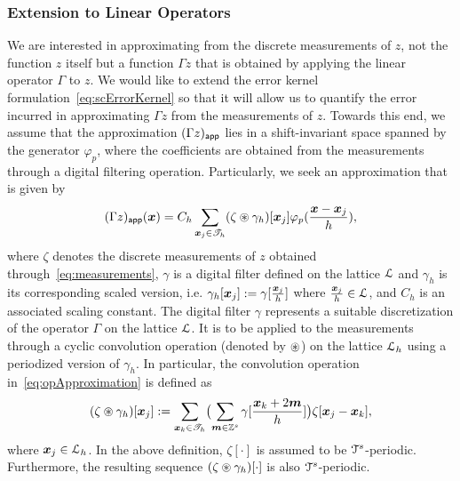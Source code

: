 \subsubsection{Extension to Linear Operators}
We are interested in approximating from the discrete measurements
of $z$, not the function $z$ itself but a function $\Gamma z$ that is obtained
by applying the linear operator $\Gamma$ to $z$. 
We would like to
extend the error kernel formulation~\eqref{eq:scErrorKernel} so that it will
allow us to quantify the error incurred in approximating $\Gamma z$ from the
measurements of $z$. Towards this end, we assume that the approximation
$(\Gamma z)_{\mathsf{app}}$ lies in a shift-invariant space spanned by the generator
$\varphi_p$, where the coefficients are obtained from the measurements through a
digital filtering operation. Particularly, we seek an approximation that is
given by
\begin{equation}
\appf{(\Gamma z)}(\vect{x}) = C_h \sum_{\vect{x}_j \in \pointset{T}_h} 
(\zeta \pconv \gamma_h)[\vect{x}_j]
\varphi_p(\frac{\vect{x}-\vect{x}_j}{h}),
\label{eq:opApproximation}
\end{equation}
where $\zeta$ denotes the discrete measurements of $z$ obtained
through~\eqref{eq:measurements}, $\gamma$ is a digital filter defined on
the lattice $\mathcal{L}$ and $\gamma_h$ is its corresponding scaled
version, i.e. $\gamma_h[\boldsymbol{x}_j] := \gamma[\tfrac{\boldsymbol{x}_j}{h}]$ where
$\tfrac{\boldsymbol{x}_j}{h} \in \mathcal{L}$, and $C_h$ is an associated
scaling constant. The digital filter $\gamma$ represents a suitable
discretization of the operator $\Gamma$ on the lattice $\mathcal{L}$. It is
to be applied to the measurements through a cyclic convolution
operation (denoted by $\circledast$) on the lattice $\mathcal{L}_h$ using a
periodized version of $\gamma_h$. In particular, the convolution operation
in~\eqref{eq:opApproximation} is defined as
\begin{equation}
  (\zeta \pconv \gamma_h)[\vect{x}_j] :=
  \sum_{\vect{x}_k \in \pointset{T}_h}
  \bigl(
    \sum_{\vect{m} \in \ints^s}\gamma[\frac{\vect{x}_k + 2\vect{m}}{h}]
  \bigr)
  \zeta[\vect{x}_j - \vect{x}_k],
\label{eq:cyclicConvolution}
\end{equation}
where $\boldsymbol{x}_j \in \mathcal{L}_h$. In the above definition,
$\zeta[\cdot]$ is assumed to be $\mathcal{T}^s$-periodic.  Furthermore, the
resulting sequence $(\zeta \circledast \gamma_h)[\cdot]$ is also
$\mathcal{T}^s$-periodic.

